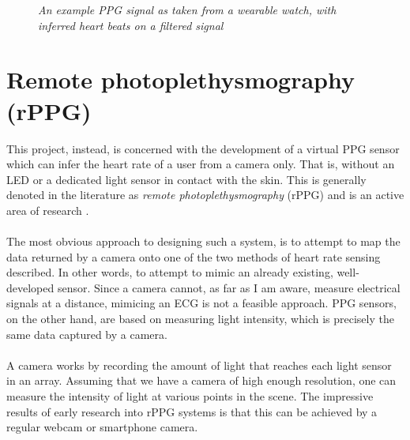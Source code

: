 \begin{figure}[H]
    \centering
    \subfloat{\scalebox{0.7}{}}
    \subfloat{\scalebox{0.7}{}}
   \caption{\textit{An example PPG signal as taken from a wearable watch, with inferred heart beats on a filtered signal} }
   \label{fig:wearable_ppg}
\end{figure}
\section{Remote photoplethysmography (rPPG)}
\label{ref:rPPG_prep}
This project, instead, is concerned with the development of a virtual PPG sensor which can infer the heart rate of a user from a camera only.
That is, without an LED or a dedicated light sensor in contact with the skin. 
This is generally denoted in the literature as \textit{remote photoplethysmography} (rPPG) and is an active area of research \cite{Verkruysse2008}\cite{poh}\cite{vanderKooij2019}.
\\\\
The most obvious approach to designing such a system, is to attempt to map the data returned by a camera onto one of the two methods of heart rate sensing described. In other words, to attempt 
to mimic an already existing, well-developed sensor.
Since a camera cannot, as far as I am aware, measure electrical signals at a distance, mimicing an ECG is not a feasible approach. PPG sensors, on the other hand, are based on measuring light intensity, which is precisely the same data captured by a camera.
\\\\
A camera works by recording the amount of light that reaches each light sensor in an array. Assuming that we have a camera of high enough resolution, one can measure the intensity of light 
at various points in the scene. The impressive results of early research into rPPG systems is that this can be achieved by a regular webcam or smartphone camera.
\\\\
